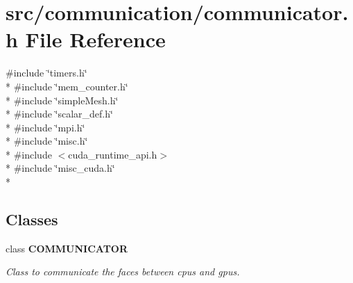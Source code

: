 \section{src/communication/communicator.h File Reference}
\label{communicator_8h}
{\ttfamily \#include \char`\"{}timers.\-h\char`\"{}}\\*
{\ttfamily \#include \char`\"{}mem\-\_\-counter.\-h\char`\"{}}\\*
{\ttfamily \#include \char`\"{}simple\-Mesh.\-h\char`\"{}}\\*
{\ttfamily \#include \char`\"{}scalar\-\_\-def.\-h\char`\"{}}\\*
{\ttfamily \#include \char`\"{}mpi.\-h\char`\"{}}\\*
{\ttfamily \#include \char`\"{}misc.\-h\char`\"{}}\\*
{\ttfamily \#include $<$cuda\-\_\-runtime\-\_\-api.\-h$>$}\\*
{\ttfamily \#include \char`\"{}misc\-\_\-cuda.\-h\char`\"{}}\\*
\subsection*{Classes}
\begin{DoxyCompactItemize}
\item 
class {\bf C\-O\-M\-M\-U\-N\-I\-C\-A\-T\-O\-R}
\begin{DoxyCompactList}\small\item\em Class to communicate the faces between cpus and gpus. \end{DoxyCompactList}\end{DoxyCompactItemize}
